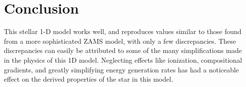 \documentclass[10pt]{article}
\begin{document}
\begin{table}[htbp]
\begin{center}
\label{tab:compare}

\end{center}
\end{table}

\section{Conclusion} \label{sec:conclusion}
This stellar 1-D model works well, and reproduces values similar to those found from a more sophisticated ZAMS model, with only a few discrepancies. These discrepancies can easily be attributed to some of the many simplifications made in the physics of this 1D model. Neglecting effects like ionization, compositional gradients, and greatly simplifying energy generation rates has had a noticeable effect on the derived properties of the star in this model.






%
\end{document}
